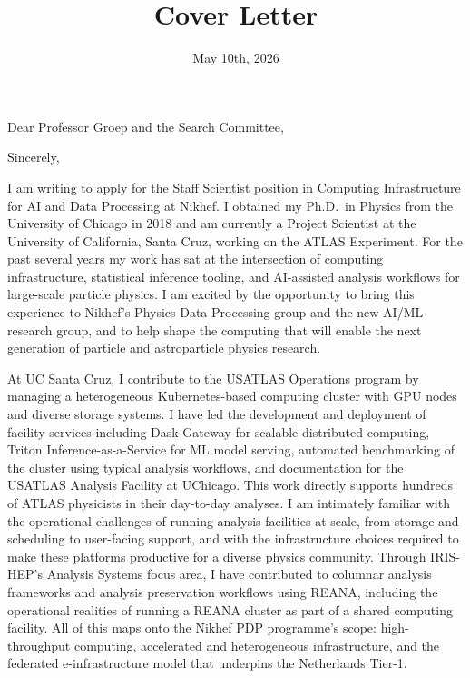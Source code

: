 \documentclass[10pt,letterpaper,sans]{moderncv} %
\title{Cover Letter}
\begin{document}
\date{May 10th, 2026}
\opening{Dear Professor Groep and the Search Committee,}
\closing{Sincerely,}

\makelettertitle
\vspace*{-1em}

I am writing to apply for the Staff Scientist position in Computing Infrastructure for AI and Data Processing at Nikhef. I obtained my Ph.D.\ in Physics from the University of Chicago in 2018 and am currently a Project Scientist at the University of California, Santa Cruz, working on the ATLAS Experiment. For the past several years my work has sat at the intersection of computing infrastructure, statistical inference tooling, and AI-assisted analysis workflows for large-scale particle physics. I am excited by the opportunity to bring this experience to Nikhef's Physics Data Processing group and the new AI/ML research group, and to help shape the computing that will enable the next generation of particle and astroparticle physics research.

At UC Santa Cruz, I contribute to the USATLAS Operations program by managing a heterogeneous Kubernetes-based computing cluster with GPU nodes and diverse storage systems. I have led the development and deployment of facility services including Dask Gateway for scalable distributed computing, Triton Inference-as-a-Service for ML model serving, automated benchmarking of the cluster using typical analysis workflows, and documentation for the USATLAS Analysis Facility at UChicago. This work directly supports hundreds of ATLAS physicists in their day-to-day analyses. I am intimately familiar with the operational challenges of running analysis facilities at scale, from storage and scheduling to user-facing support, and with the infrastructure choices required to make these platforms productive for a diverse physics community. Through IRIS-HEP's Analysis Systems focus area, I have contributed to columnar analysis frameworks and analysis preservation workflows using REANA, including the operational realities of running a REANA cluster as part of a shared computing facility. All of this maps onto the Nikhef PDP programme's scope: high-throughput computing, accelerated and heterogeneous infrastructure, and the federated e-infrastructure model that underpins the Netherlands Tier-1.
\end{document}
